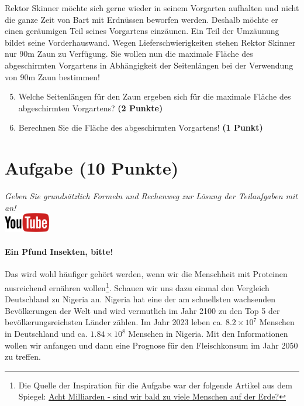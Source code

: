\documentclass[a4paper, 9pt]{scrartcl}\usepackage[]{graphicx}\usepackage[]{xcolor}
\begin{document}
Rektor Skinner m{\"o}chte sich gerne wieder in seinem Vorgarten aufhalten und
nicht die ganze Zeit von Bart mit Erdn{\"u}ssen beworfen werden. Deshalb m{\"o}chte
er einen ger{\"a}umigen Teil seines Vorgartens einz{\"a}unen. Ein Teil der
Umz{\"a}unung bildet seine Vorderhauswand. Wegen Lieferschwierigkeiten stehen
Rektor Skinner nur 90m Zaun zu Verf{\"u}gung. Sie wollen nun die
maximale Fl{\"a}che des abgeschirmten Vorgartens in Abh{\"a}ngigkeit der
Seitenl{\"a}ngen bei der Verwendung von 90m Zaun bestimmen!

\begin{enumerate}
  \setcounter{enumi}{4}  
\item  Welche Seitenl{\"a}ngen f{\"u}r den Zaun ergeben sich f{\"u}r die
  maximale Fl{\"a}che des abgeschirmten Vorgartens? \textbf{(2 Punkte)}
\item Berechnen Sie die Fl{\"a}che des abgeschirmten Vorgartens! \textbf{(1
    Punkt)}
\end{enumerate}

 
\clearpage

\section{Aufgabe \hfill (10 Punkte)}

\textit{Geben Sie grunds{\"a}tzlich Formeln und Rechenweg zur L{\"o}sung der
  Teilaufgaben mit an!} \\[1Ex]

\hfill\href{https://youtu.be/OhyuH6hzEhY}{\includegraphics[width = 2cm]{img/youtube}} %
\hspace{2Ex}




\paragraph{Ein Pfund Insekten, bitte!} Das wird wohl h{\"a}ufiger geh{\"o}rt
werden, wenn wir die Menschheit mit Proteinen ausreichend ern{\"a}hren
wollen\footnote{Die Quelle der Inspiration f{\"u}r die Aufgabe war der folgende
  Artikel aus dem Spiegel:
  \href{https://www.spiegel.de/ausland/ueberbevoelkerung-acht-milliarden-sind-wir-bald-zu-viele-menschen-auf-der-erde-a-3f20c7bc-3d60-4440-9f52-eb338db207f5}{Acht
    Milliarden - sind wir bald zu viele Menschen auf der Erde?}}. Schauen
wir uns dazu einmal den Vergleich Deutschland zu Nigeria an. Nigeria hat
eine der am schnellsten wachsenden Bev{\"o}lkerungen der Welt und wird
vermutlich im Jahr 2100 zu den Top 5 der bev{\"o}lkerungsreichsten L{\"a}nder
z{\"a}hlen. Im Jahr 2023 leben ca. \ensuremath{8.2\times 10^{7}} Menschen in
Deutschland und ca. \ensuremath{1.84\times 10^{8}} Menschen in Nigeria. Mit den
Informationen wollen wir anfangen und dann eine Prognose f{\"u}r den
Fleischkonsum im Jahr 2050 zu treffen. \\ 
\end{document}
